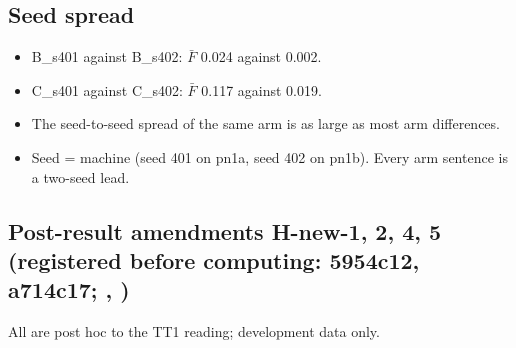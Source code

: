 \documentclass[10pt,twocolumn,letterpaper]{article}
\providecommand{\tightlist}{\setlength{\itemsep}{0pt}\setlength{\parskip}{0pt}}
\begin{document}
\subsection{Seed spread}\label{seed-spread}

\begin{itemize}
\tightlist
\item
  B\_s401 against B\_s402: \(\bar F\) 0.024 against 0.002.
\item
  C\_s401 against C\_s402: \(\bar F\) 0.117 against 0.019.
\item
  The seed-to-seed spread of the same arm is as large as most arm differences.
\item
  Seed = machine (seed 401 on pn1a, seed 402 on pn1b). Every arm sentence is a two-seed lead.
\end{itemize}

\subsection{\texorpdfstring{Post-result amendments H-new-1, 2, 4, 5 (registered before computing: 5954c12, a714c17; \protect{}, \protect{})}{Post-result amendments H-new-1, 2, 4, 5 (registered before computing: 5954c12, a714c17; , )}}\label{post-result-amendments-h-new-1-2-4-5-registered-before-computing-5954c12-a714c17}

All are post hoc to the TT1 reading; development data only.
\end{document}
